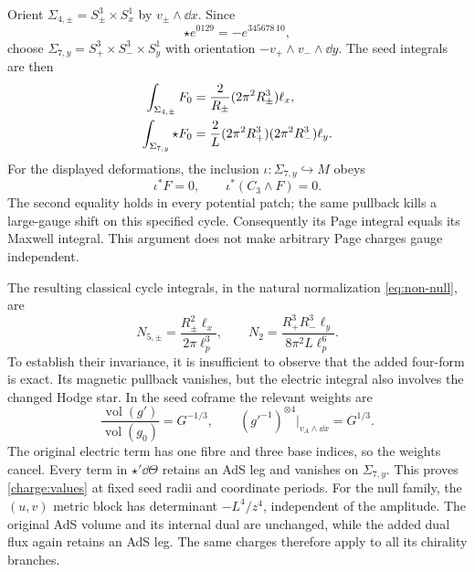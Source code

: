 Orient $\Sigma_{4,\pm}=S^3_\pm\times S^1_x$ by $v_\pm\wedge\dd x$. Since
\begin{equation}
\star e^{0129}=-e^{345678\,10},
\end{equation}
choose $\Sigma_{7,y}=S^3_+\times S^3_-\times S^1_y$ with orientation $-v_+\wedge v_-\wedge\dd y$. The seed integrals are then
\begin{align}
\int_{\Sigma_{4,\pm}}F_0&=\frac{2}{R_\pm}(2\pi^2R_\pm^3)\ell_x,\notag\\
\int_{\Sigma_{7,y}}\star F_0&=\frac{2}{L}(2\pi^2R_+^3)(2\pi^2R_-^3)\ell_y.
\end{align}
For the displayed deformations, the inclusion $\iota:\Sigma_{7,y}\hookrightarrow M$ obeys
\begin{equation}
\iota^*F=0,\qquad
\iota^*(C_3\wedge F)=0.
\label{charge:page-reduction}
\end{equation}
The second equality holds in every potential patch; the same pullback kills a large-gauge shift on this specified cycle. Consequently its Page integral equals its Maxwell integral. This argument does not make arbitrary Page charges gauge independent.

The resulting classical cycle integrals, in the natural normalization \eqref{eq:non-null}, are
\begin{equation}
\boxed{N_{5,\pm}=\frac{R_\pm^2\ell_x}{2\pi\ell_p^3},\qquad
N_2=\frac{R_+^3R_-^3\ell_y}{8\pi^2L\ell_p^6}.}
\label{charge:values}
\end{equation}
To establish their invariance, it is insufficient to observe that the added four-form is exact. Its magnetic pullback vanishes, but the electric integral also involves the changed Hodge star. In the seed coframe the relevant weights are
\begin{equation}
\frac{\operatorname{vol}(g')}{\operatorname{vol}(g_0)}=G^{-1/3},\qquad
(g'^{-1})^{\otimes4}\big|_{v_A\wedge\dd x}=G^{1/3}.
\label{charge:hodge-weights}
\end{equation}
The original electric term has one fibre and three base indices, so the weights cancel. Every term in $\star'\dd\Theta$ retains an AdS leg and vanishes on $\Sigma_{7,y}$. This proves \eqref{charge:values} at fixed seed radii and coordinate periods. For the null family, the $(u,v)$ metric block has determinant $-L^4/z^4$, independent of the amplitude. The original AdS volume and its internal dual are unchanged, while the added dual flux again retains an AdS leg. The same charges therefore apply to all its chirality branches.

